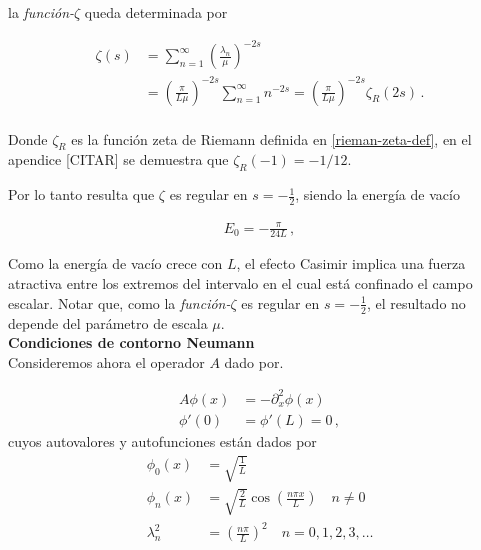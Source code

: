la {\it función-$\zeta$} queda determinada por

\begin{equation}
\begin{aligned}
\zeta  (s) &= 
\sum _{n=1} ^{\infty} \left( \frac{\lambda _n }{\mu }  \right) ^{-2s}  \\[10pt]
&= \left(  \frac{\pi}{L \mu} \right) ^{-2s}   \sum _{n=1} ^{\infty} n ^{-2s} = 
\left( \frac{\pi}{L \mu} \right) ^{-2s}  \zeta _R (2s) \, . \\[10pt]
\end{aligned}
\end{equation}

Donde $\zeta _R$ es la función zeta de Riemann definida en \ref{rieman-zeta-def}, en el apendice [CITAR] se demuestra  que $\zeta _R (-1) = -1/12$. 

Por lo tanto resulta que $\zeta$ es regular en $s=-\frac{1}{2}$, siendo la energía de vacío

\begin{equation}\label{eq.energia.dirichlet}
\begin{array}{c}
E _0 = - \frac{\pi}{24 L} \, ,
\end{array}
\end{equation}


Como la energía de vacío crece con $L$, el efecto Casimir implica una fuerza
atractiva entre los extremos del intervalo en el cual está confinado el campo
escalar. Notar que, como la {\it función-$\zeta$} es regular en $s=-\frac{1}{2}$, el resultado no depende del parámetro de escala $\mu$.\\

\textbf{Condiciones de contorno Neumann}\\

Consideremos ahora el operador $A$ dado por.

\begin{equation}
\begin{aligned}
	A \phi (x) &= - \partial _x ^2 \phi (x) \\[10pt]
    \phi ' (0) &= \phi ' (L) = 0 \, ,
\end{aligned}
\end{equation}
cuyos autovalores y autofunciones están dados por
\begin{equation}
\begin{aligned}
	\phi _0 (x) &= \sqrt{ \frac{1}{L} } \\[5pt]
	\phi _n (x)  &= \sqrt{\frac{2}{L}} \cos \left( \frac{n \pi x}{L} \right) 
	\, \, \, \, \, \, n \neq 0\\[5pt]
	\lambda ^2 _n  &= \left( \frac{n \pi }{L} \right) ^2 
	\, \, \, \, \, \,
	n = 0,1,2,3, \dots
	\\[5pt]
\end{aligned}
\end{equation}



